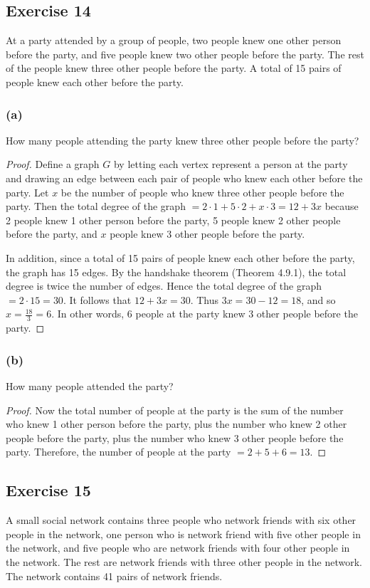\documentclass[14pt]{extarticle}
\begin{document}
\subsection{Exercise 14}
At a party attended by a group of people, two people knew one other person before the party, and five people knew two other people before the party. The rest of the people knew three other people before the party. A total of 15 pairs of people knew each other before the party.

\subsubsection{(a)}
How many people attending the party knew three other people before the party?

\begin{proof}
Define a graph $G$ by letting each vertex represent a person at the party and drawing an edge between each pair of people who knew each other before the party. Let $x$ be the number of people who knew three other people before the party. Then the total degree of the graph $ = 2\cdot 1 + 5\cdot 2 + x\cdot 3 = 12 + 3x$ because 2 people knew 1 other person before the party, 5 people knew 2 other people before the party, and $x$ people knew 3 other people before the party. 

In addition, since a total of 15 pairs of people knew each other before the party, the graph has 15 edges. By the handshake theorem (Theorem 4.9.1), the total degree is twice the number of edges. Hence the total degree of the graph $= 2 \cdot 15 = 30$. It follows that $12 + 3x = 30$. Thus $3x = 30 - 12 = 18$, and so $x = \frac{18}{3} = 6$. In other words, 6 people at the party knew 3 other people before the party.
\end{proof}

\subsubsection{(b)}
How many people attended the party?

\begin{proof}
Now the total number of people at the party is the sum of the number who knew 1 other person before the party, plus the number who knew 2 other people before the party, plus the number who knew 3 other people before the party. Therefore, the number of people at the party $= 2 + 5 + 6 = 13$.
\end{proof}

\subsection{Exercise 15}
A small social network contains three people who network friends with six other people in the network, one person who is network friend with five other people in the network, and five people who are network friends with four other people in the network. The rest are network friends with three other people in the network. The network contains 41 pairs of network friends.
\end{document}
